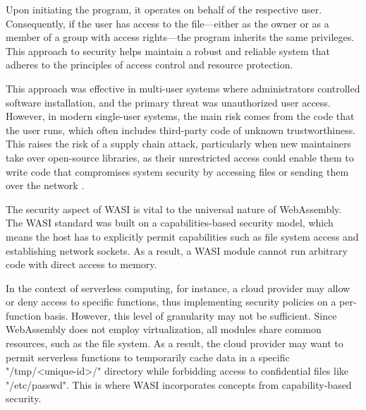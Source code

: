 Upon initiating the program, it operates on behalf of the respective user. Consequently, if the user has access to the file—either as the owner or as a member of a group with access rights—the program inherits the same privileges. This approach to security helps maintain a robust and reliable system that adheres to the principles of access control and resource protection.

This approach was effective in multi-user systems where administrators controlled software installation, and the primary threat was unauthorized user access. However, in modern single-user systems, the main risk comes from the code that the user runs, which often includes third-party code of unknown trustworthiness. This raises the risk of a supply chain attack, particularly when new maintainers take over open-source libraries, as their unrestricted access could enable them to write code that compromises system security by accessing files or sending them over the network \cite{clark_2019_standardising}.


The security aspect of WASI is vital to the universal nature of WebAssembly. The WASI standard was built on a capabilities-based security model, which means the host has to explicitly permit capabilities such as file system access and establishing network sockets. As a result, a WASI module cannot run arbitrary code with direct access to memory.

In the context of serverless computing, for instance, a cloud provider may allow or deny access to specific functions, thus implementing security policies on a per-function basis. However, this level of granularity may not be sufficient. Since WebAssembly does not employ virtualization, all modules share common resources, such as the file system. As a result, the cloud provider may want to permit serverless functions to temporarily cache data in a specific "/tmp/<unique-id>/" directory while forbidding access to confidential files like "/etc/passwd". This is where WASI incorporates concepts from capability-based security.
